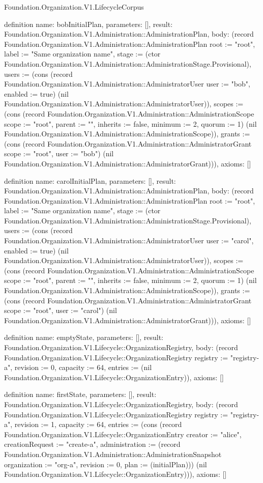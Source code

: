 \begin{lexlean}{Foundation.Organization.V1.LifecycleCorpus}
\begin{semanticmodule}
definition{
  name: bobInitialPlan,
  parameters: [],
  result: Foundation.Organization.V1.Administration::AdministrationPlan,
  body: (record Foundation.Organization.V1.Administration::AdministrationPlan {root := "root", label := "Same organization name", stage := (ctor Foundation.Organization.V1.Administration::AdministrationStage.Provisional), users := (cons (record Foundation.Organization.V1.Administration::AdministratorUser {user := "bob", enabled := true}) (nil Foundation.Organization.V1.Administration::AdministratorUser)), scopes := (cons (record Foundation.Organization.V1.Administration::AdministrationScope {scope := "root", parent := "", inherits := false, minimum := 2, quorum := 1}) (nil Foundation.Organization.V1.Administration::AdministrationScope)), grants := (cons (record Foundation.Organization.V1.Administration::AdministratorGrant {scope := "root", user := "bob"}) (nil Foundation.Organization.V1.Administration::AdministratorGrant))}),
  axioms: []
}

definition{
  name: carolInitialPlan,
  parameters: [],
  result: Foundation.Organization.V1.Administration::AdministrationPlan,
  body: (record Foundation.Organization.V1.Administration::AdministrationPlan {root := "root", label := "Same organization name", stage := (ctor Foundation.Organization.V1.Administration::AdministrationStage.Provisional), users := (cons (record Foundation.Organization.V1.Administration::AdministratorUser {user := "carol", enabled := true}) (nil Foundation.Organization.V1.Administration::AdministratorUser)), scopes := (cons (record Foundation.Organization.V1.Administration::AdministrationScope {scope := "root", parent := "", inherits := false, minimum := 2, quorum := 1}) (nil Foundation.Organization.V1.Administration::AdministrationScope)), grants := (cons (record Foundation.Organization.V1.Administration::AdministratorGrant {scope := "root", user := "carol"}) (nil Foundation.Organization.V1.Administration::AdministratorGrant))}),
  axioms: []
}

definition{
  name: emptyState,
  parameters: [],
  result: Foundation.Organization.V1.Lifecycle::OrganizationRegistry,
  body: (record Foundation.Organization.V1.Lifecycle::OrganizationRegistry {registry := "registry-a", revision := 0, capacity := 64, entries := (nil Foundation.Organization.V1.Lifecycle::OrganizationEntry)}),
  axioms: []
}

definition{
  name: firstState,
  parameters: [],
  result: Foundation.Organization.V1.Lifecycle::OrganizationRegistry,
  body: (record Foundation.Organization.V1.Lifecycle::OrganizationRegistry {registry := "registry-a", revision := 1, capacity := 64, entries := (cons (record Foundation.Organization.V1.Lifecycle::OrganizationEntry {creator := "alice", creationRequest := "create-a", administration := (record Foundation.Organization.V1.Administration::AdministrationSnapshot {organization := "org-a", revision := 0, plan := (initialPlan)})}) (nil Foundation.Organization.V1.Lifecycle::OrganizationEntry))}),
  axioms: []
}


\end{semanticmodule}
\end{lexlean}
